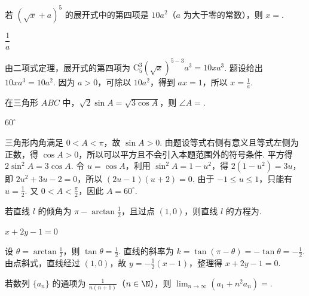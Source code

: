 \begin{problem}
若 \( (\sqrt{x}+a)^{5} \) 的展开式中的第四项是 \( 10a^{2} \)（\(a\) 为大于零的常数），则 \(x=\)\fillinblank{}.
\end{problem}

\begin{answer}
\(\dfrac{1}{a}\)
\end{answer}

\begin{solution}
由二项式定理，展开式的第四项为
\(\mathrm C_5^3(\sqrt{x})^{5-3}a^3=10xa^3\). 题设给出 \(10xa^3=10a^2\). 因为 \(a>0\)，可除以 \(10a^2\)，得到 \(ax=1\)，所以 \(x=\frac1a\).
\end{solution}

\begin{problem}
在三角形 \(ABC\) 中，\(\sqrt{2} \sin A = \sqrt{3\cos A}\)，则 \(\angle A =\)\fillinblank{}.
\end{problem}

\begin{answer}
\(60^\circ\)
\end{answer}

\begin{solution}
三角形内角满足 \(0<A<\pi\)，故 \(\sin A>0\). 由题设等式右侧有意义且等式左侧为正数，得 \(\cos A>0\)，所以可以平方且不会引入本题范围外的符号条件. 平方得
\(2\sin^2A=3\cos A\). 令 \(u=\cos A\)，利用 \(\sin^2A=1-u^2\)，得 \(2(1-u^2)=3u\)，即
\(2u^2+3u-2=0\)，所以 \((2u-1)(u+2)=0\). 由于 \(-1\leqslant u\leqslant1\)，只能有 \(u=\frac12\). 又 \(0<A<\frac\pi2\)，因此 \(A=60^\circ\).
\end{solution}

\begin{problem}
若直线 \(l\) 的倾角为 \( \pi - \arctan\frac{1}{2} \)，且过点 \( (1,0) \)，则直线 \(l\) 的方程为\fillinblank{}.
\end{problem}

\begin{answer}
\(x+2y-1=0\)
\end{answer}

\begin{solution}
设 \(\theta=\arctan\frac12\)，则 \(\tan\theta=\frac12\). 直线的斜率为
\(k=\tan(\pi-\theta)=-\tan\theta=-\frac12\). 由点斜式，直线经过 \((1,0)\)，故
\(y=-\frac12(x-1)\)，整理得 \(x+2y-1=0\).
\end{solution}

\begin{problem}
若数列 \(\{a_{n}\}\) 的通项为 \(\frac{1}{n(n + 1)}\)（\(n \in \N\)），则 \(\displaystyle\lim_{n \to \infty} (a_{1} + n^{2} a_{n}) =\)\fillinblank{}.
\end{problem}

